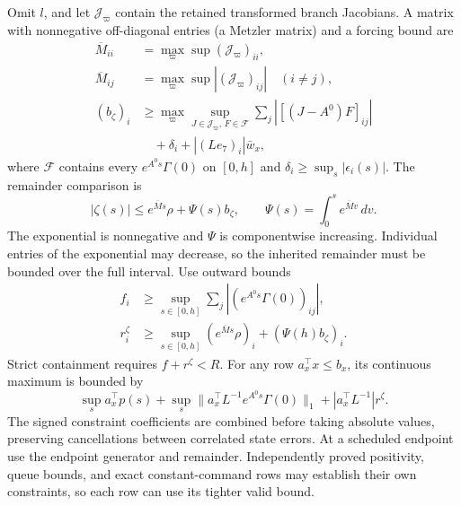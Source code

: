 \documentclass[preprint,12pt]{elsarticle}
\begin{document}
Omit $l$, and let $\mathcal J_\varpi$ contain the retained transformed branch
Jacobians. A matrix with nonnegative off-diagonal entries (a Metzler
matrix) and a forcing bound are
\begin{equation}
 \begin{aligned}
 \overline{M}_{ii}&=\max_\varpi\sup(\mathcal J_\varpi)_{ii},\\
 \overline{M}_{ij}&=\max_\varpi\sup|(\mathcal J_\varpi)_{ij}|\quad(i\ne j),\\
 (b_\zeta)_i&\ge\max_\varpi\sup_{J\in\mathcal J_\varpi,\,F\in\mathcal F}
                  \sum_j|[(J-A^0)F]_{ij}|\\
             &\hspace{1em}+\delta_i+|(Le_7)_i|\bar w_x,
 \end{aligned}
 \label{eq:structure-metzler}
\end{equation}
where $\mathcal F$ contains every $e^{A^0s}\Gamma(0)$ on $[0,h]$ and
$\delta_i\ge\sup_s|\epsilon_i(s)|$. The remainder comparison is
\begin{equation}
 |\zeta(s)|\le e^{\overline{M}s}\rho+\Psi(s)b_\zeta,
 \qquad \Psi(s)=\int_0^s e^{\overline{M}v}\,dv.
 \label{eq:structure-remainder-bound}
\end{equation}
The exponential is nonnegative and $\Psi$ is componentwise increasing.
Individual entries of the exponential may decrease, so the inherited
remainder must be bounded over the full interval. Use outward bounds
\begin{equation}
 \begin{aligned}
 f_i&\ge\sup_{s\in[0,h]}\sum_j|(e^{A^0s}\Gamma(0))_{ij}|,\\
 r_i^\zeta&\ge\sup_{s\in[0,h]}(e^{\overline{M}s}\rho)_i
                            +(\Psi(h)b_\zeta)_i.
 \end{aligned}
 \label{eq:structure-continuous-radii}
\end{equation}
Strict containment requires $f+r^\zeta<R$. For any row
$a_x^\top x\le b_x$, its continuous maximum is bounded by
\begin{equation}
 \sup_s a_x^\top p(s)+
 \sup_s\|a_x^\top L^{-1}e^{A^0s}\Gamma(0)\|_1+
 |a_x^\top L^{-1}|r^\zeta.
 \label{eq:structure-signed-output}
\end{equation}
The signed constraint coefficients are combined before taking absolute
values, preserving cancellations between correlated state errors. At a
scheduled endpoint use the endpoint generator and remainder. Independently
proved positivity, queue bounds, and exact constant-command rows may
establish their own constraints, so each row can use its tighter valid bound.
\end{document}
